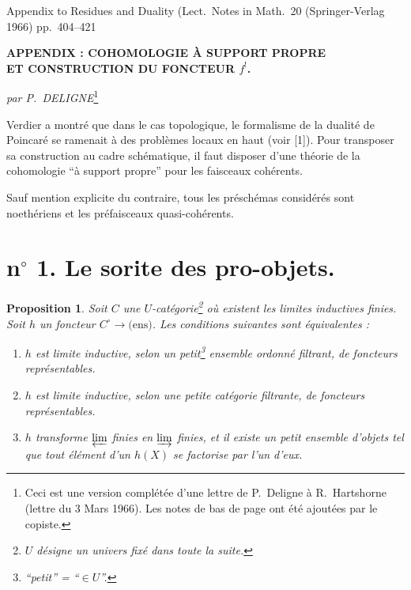 \documentclass[12pt]{amsart}
\theoremstyle{plain}
\newtheorem{prop}{Proposition}[section]
\theoremstyle{definition}
\begin{document}
\begin{center}
Appendix to Residues and Duality (Lect.\ Notes in Math.\ 20 (Springer-Verlag 1966) pp.\ 404--421
\end{center}

\bigskip

\begin{center}
\textbf{APPENDIX : COHOMOLOGIE \`A SUPPORT PROPRE}\\[4pt]
\textbf{ET CONSTRUCTION DU FONCTEUR $f^{!}$.}
\end{center}

\medskip

\begin{center}
\textit{par P.\ DELIGNE}\footnote{Ceci est une version compl\'et\'ee d'une lettre de P.\ Deligne \`a R.\ Hartshorne (lettre du 3 Mars 1966). Les notes de bas de page ont \'et\'e ajout\'ees par le copiste.}
\end{center}

\bigskip

Verdier a montr\'e que dans le cas topologique, le formalisme de la dualit\'e de Poincar\'e se ramenait \`a des probl\`emes locaux en haut (voir [1]). Pour transposer sa construction au cadre sch\'ematique, il faut disposer d'une th\'eorie de la cohomologie ``\`a support propre'' pour les faisceaux coh\'erents.

Sauf mention explicite du contraire, tous les pr\'esch\'emas consid\'er\'es sont noeth\'eriens et les pr\'efaisceaux quasi-coh\'erents.

\section*{n$^{\circ}$ 1. Le sorite des pro-objets.}

\begin{prop}
Soit $C$ une $U$-cat\'egorie\footnote{$U$ d\'esigne un univers fix\'e dans toute la suite.} o\`u existent les limites inductives finies. Soit $h$ un foncteur $C^{\circ} \to \text{(ens)}$. Les conditions suivantes sont \'equivalentes :
\begin{enumerate}
\item[(i)] $h$ est limite inductive, selon un petit\footnote{``petit'' = ``$\in U$''.} ensemble ordonn\'e filtrant, de foncteurs repr\'esentables.
\item[(ii)] $h$ est limite inductive, selon une petite cat\'egorie filtrante, de foncteurs repr\'esentables.
\item[(iii)] $h$ transforme $\varprojlim$ finies en $\varinjlim$ finies, et il existe un petit ensemble d'objets tel que tout \'el\'ement d'un $h(X)$ se factorise par l'un d'eux.
\end{enumerate}
\end{prop}
\end{document}
